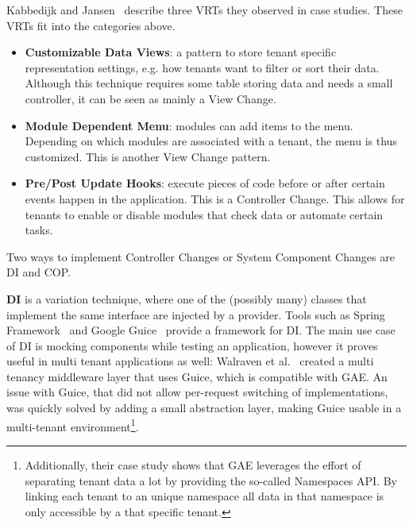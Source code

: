 Kabbedijk and Jansen~\cite{kabbedijk2011variability} describe three \acp{VRT} they observed in case studies. These \acp{VRT}  fit into the categories above.
\begin{itemize} 
\item \textbf{Customizable Data Views}: a pattern to store tenant specific representation settings, e.g. how tenants want to filter or sort their data. 
Although this technique requires some table storing data and needs a small controller, it can be seen as mainly a View Change.
\item \textbf{Module Dependent Menu}: modules can add items to the menu. Depending on which modules are associated with a tenant, the menu is thus customized. This is another View Change pattern. 
\item \textbf{Pre/Post Update Hooks}: execute pieces of code before or after certain events happen in the application. This is a Controller Change. 
This allows for tenants to enable or disable modules that check data or automate certain tasks.
\end{itemize}

Two ways to implement Controller Changes or System Component Changes are \acl{DI} and \acl{COP}.

\textbf{\acf{DI}} is a variation technique, where one of the (possibly many) classes that implement the same interface are injected by a provider. Tools such as Spring Framework~\cite{walls2005spring} and Google Guice~\cite{vanbrabant2008google} provide a framework for \ac{DI}. The main use case of \ac{DI} is mocking components while testing an application, however it proves useful in multi tenant applications as well:
Walraven et al.~\cite{walraven2011middleware} created a multi tenancy middleware layer that uses Guice, which is compatible with \ac{GAE}. An issue with Guice, that did not allow per-request switching of implementations, was quickly solved by adding a small abstraction layer, making Guice usable in a multi-tenant environment\footnote{
Additionally, their case study shows that \ac{GAE} leverages the effort of separating tenant data a lot by providing the so-called Namespaces API. By linking each tenant to an unique namespace all data in that namespace is only accessible by a that specific tenant.}.

